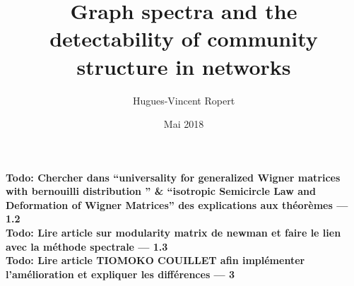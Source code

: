 \documentclass{article} %
\title{Graph spectra and the detectability of community structure in networks}
\author{Hugues-Vincent Ropert}
\date{Mai 2018}
\begin{document}
\maketitle

\textbf{Todo: Chercher dans ``universality for generalized Wigner matrices with bernouilli distribution '' \& ``isotropic Semicircle Law and Deformation of Wigner Matrices'' des explications aux théorèmes --- 1.2}\\

\textbf{Todo: Lire article sur modularity matrix de newman et faire le lien avec la méthode spectrale --- 1.3}\\

\textbf{Todo: Lire article TIOMOKO COUILLET afin implémenter l'amélioration et expliquer les différences --- 3}\\
\tableofcontents




\nocite{*}


\end{document}
